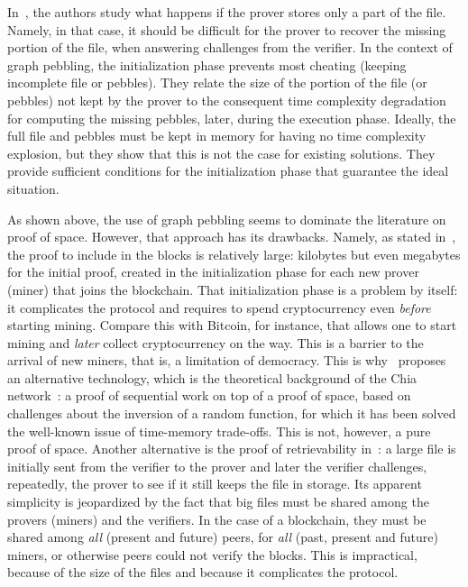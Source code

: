 In~\cite{Reyzin23}, the authors study what happens if the prover stores only a part of the file.
Namely, in that case, it should be difficult for the prover to recover the
missing portion of the file, when answering challenges from the verifier.
In the context of graph pebbling, the initialization phase prevents most cheating
(keeping incomplete file or pebbles). They relate the size
of the portion of the file (or pebbles) not kept by the prover to the consequent time complexity degradation
for computing the missing pebbles, later, during the execution phase.
Ideally, the full file and pebbles must be kept in memory
for having no time complexity explosion, but they show that this is not the case for existing solutions.
They provide sufficient conditions for the initialization phase that guarantee the ideal situation.

As shown above, the use of graph pebbling seems to dominate the literature on proof of space.
However, that approach has its drawbacks.
Namely, as stated in~\cite{AbusalahACKPR17}, the proof to include in the blocks is relatively large:
kilobytes but even megabytes for the initial proof, created in the initialization phase for each new
prover (miner) that joins the blockchain. That initialization phase is a problem by itself: it complicates
the protocol and requires to spend cryptocurrency even \emph{before}
starting mining. Compare this with Bitcoin, for instance, that allows one to start mining
and \emph{later} collect cryptocurrency on the way. This is a barrier to the arrival of new
miners, that is, a limitation of democracy.
This is why~\cite{AbusalahACKPR17} proposes an alternative technology, which is the
theoretical background of the Chia network~\cite{Chia}:
a proof of sequential work on top of a proof of space, based on challenges
about the inversion of a random function, for which it has been solved
the well-known issue of time-memory trade-offs. This is not, however, a pure proof of space.
Another alternative is the proof of retrievability in~\cite{JuelsK07}: a large file
is initially sent from the verifier to the prover and later the verifier
challenges, repeatedly, the prover to see if it still keeps the file in storage.
Its apparent simplicity
is jeopardized by the fact that big files must be shared among the provers (miners) and
the verifiers. In the case of a blockchain, they must be shared among \emph{all} (present and future)
peers, for \emph{all} (past, present and future) miners, or otherwise peers could not verify the blocks.
This is impractical, because of the size of the files and because it complicates the protocol.

